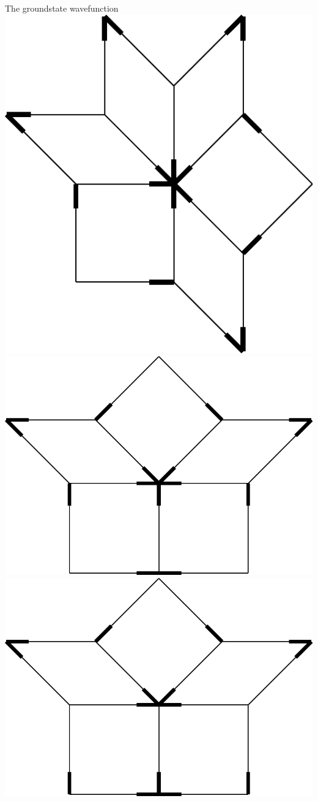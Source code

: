 \documentclass[xcolor=x11names,compress,professionalfonts, aspectratio=169]{beamer}
\renewcommand{\(}{\begin{columns}}
\renewcommand{\)}{\end{columns}}
\newcommand{\<}[1]{\begin{column}{#1}}
\renewcommand{\>}{\end{column}}
\begin{document}
\begin{frame}{The groundstate wavefunction}
{\includegraphics[scale=\s]{img/env_C.pdf}
\includegraphics[scale=\s]{img/env_D1.pdf}
\includegraphics[scale=\s]{img/env_D2.pdf}
}
\end{frame}
\end{document}
